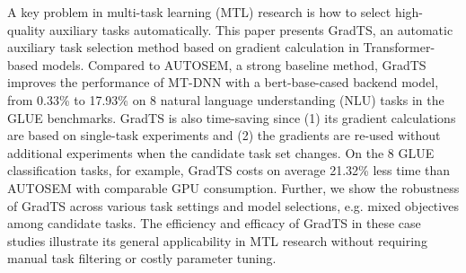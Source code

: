 A key problem in multi-task learning (MTL) research is how to select high-quality auxiliary tasks automatically. This paper presents GradTS, an automatic auxiliary task selection method based on gradient calculation in Transformer-based models. Compared to AUTOSEM, a strong baseline method, GradTS improves the performance of MT-DNN with a bert-base-cased backend model, from 0.33\% to 17.93\% on 8 natural language understanding (NLU) tasks in the GLUE benchmarks. GradTS is also time-saving since (1) its gradient calculations are based on single-task experiments and (2) the gradients are re-used without additional experiments when the candidate task set changes. On the 8 GLUE classification tasks, for example, GradTS costs on average 21.32\% less time than AUTOSEM with comparable GPU consumption. Further, we show the robustness of GradTS across various task settings and model selections, e.g. mixed objectives among candidate tasks. The efficiency and efficacy of GradTS in these case studies illustrate its general applicability in MTL research without requiring manual task filtering or costly parameter tuning.
